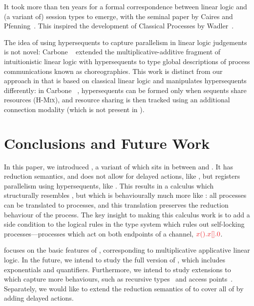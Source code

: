 \documentclass[submission,copyright,creativecommons]{eptcs}
\begin{document}
It took more than ten years for a formal correspondence between linear logic and (a variant of) session types to emerge, with the seminal paper by Caires and Pfenning~\cite{caires2010}. This inspired the development of Classical Processes by Wadler~\cite{wadler2012}.

The idea of using hypersequents to capture parallelism in linear logic judgements is not novel: Carbone \etal~\cite{carbone2018} extended the multiplicative-additive fragment of intuitionistic linear logic with hypersequents to type global descriptions of process communications known as choreographies. This work is distinct from our approach in that \hcp is based on classical linear logic and manipulates hypersequents differently: in Carbone \etal~\cite{carbone2018}, hypersequents can be formed only when sequents share resources (\cf \textsc{H-Mix}), and resource sharing is then tracked using an additional connection modality (which is not present in \hcp).

\section{Conclusions and Future Work}
\label{sec:conclusion}
In this paper, we introduced \hcp, a variant of \dhcp which sits in between \cp and \dhcp. It has reduction semantics, and does not allow for delayed actions, like \cp, but registers parallelism using hypersequents, like \dhcp. This results in a calculus which structurally resembles \dhcp, but which is behaviourally much more like \cp: all \cp processes can be translated to \hcp processes, and this translation preserves the reduction behaviour of the process. The key insight to making this calculus work is to add a side condition to the logical rules in the type system which rules out self-locking processes---processes which act on both endpoints of a channel, \eg $\tm{\piRecv{x}{}{\piBoundSend{x}{}{\piHalt}}}$.

\hcp focuses on the basic features of \cp, corresponding to multiplicative applicative linear logic. In the future, we intend to study the full version of \hcp, which includes exponentials and quantifiers. Furthermore, we intend to study extensions to \hcp which capture more behaviours, such as recursive types~\cite{lindley2016} and access points~\cite{gay2009}. Separately, we would like to extend the reduction semantics of \hcp to cover all of \dhcp by adding delayed actions.



\end{document}
